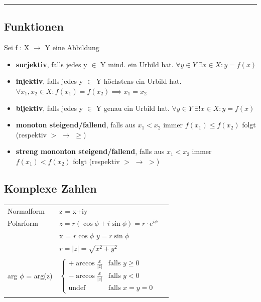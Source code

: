 \documentclass[6pt]{article}
\begin{document}
\begin{multicols*}{3}
\vspace{-6mm}
\noindent\rule{9cm}{0.1pt}
\vspace{-5mm}

\subsection*{Funktionen}
Sei f : X $\rightarrow$ Y eine Abbildung
\begin{itemize}[leftmargin=*,align=left]
	\setlength{\itemsep}{2pt}
		\item {\bf surjektiv}, falls jedes y $\in$ Y mind. ein Urbild hat. \newline
				 $\forall y \in Y \; \exists x \in X: y = f(x)$
		\item  {\bf injektiv}, falls jedes y $\in$ Y h{\"o}chstens ein Urbild hat. \newline
				 $ \forall x_1,x_2 \in X: f(x_1) = f(x_2) \implies x_1 = x_2$
		\item  {\bf bijektiv}, falls jedes y $\in$ Y genau ein Urbild hat. \newline
				 $\forall y \in Y \; \exists ! x \in X: y = f(x)$
		\item {\bf monoton steigend/fallend}, falls aus $x_1 < x_2$ immer $f(x_1) \leq f(x_2)$ folgt (respektiv $>$ $\rightarrow$ $\geq$)
		\item {\bf streng mononton steigend/fallend},  falls aus $x_1 < x_2$ immer $f(x_1) < f(x_2)$ folgt (respektiv $>$ $\rightarrow$ $>$)
	\end{itemize}
	
\columnbreak


\subsection*{Komplexe Zahlen}

\begin{tabular}{lll}
 Normalform 		&  z = x+iy \\
 Polarform 			&	$z = r (\cos \phi +i \sin \phi) = r \cdot e^{i \phi}$ \\ 
									& x =  $r \cos \phi$ \quad $y = r \sin \phi$ \\
 									&  $r = |z| =\sqrt{x^2+y^2}$ \\
 									& \\
 arg $\phi$ = arg(z) & $\left\{ \begin{array}{ll} + \arccos \tfrac{x}{|z|} & \text{falls } y \geq 0 \\ - \arccos \tfrac{x}{|z|} & \text{falls } y < 0 \\ \text{undef} & \text{falls } x = y = 0 \end{array} \right.$ \\
 									& \\
 				

\end{tabular}
\end{multicols*}
\end{document}
